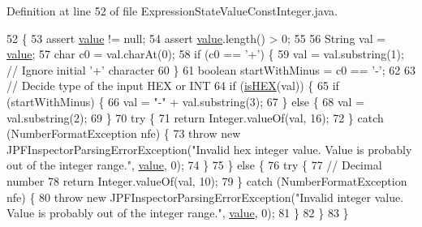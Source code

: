 Definition at line 52 of file Expression\+State\+Value\+Const\+Integer.\+java.


\begin{DoxyCode}
52                                                                                              \{
53     assert \hyperlink{classgov_1_1nasa_1_1jpf_1_1inspector_1_1server_1_1expression_1_1expressions_1_1_expression_state_value_const_integer_a17498ef8a0993ee14ae829c5aaf420b6}{value} != null;
54     assert \hyperlink{classgov_1_1nasa_1_1jpf_1_1inspector_1_1server_1_1expression_1_1expressions_1_1_expression_state_value_const_integer_a17498ef8a0993ee14ae829c5aaf420b6}{value}.length() > 0;
55 
56     String val = \hyperlink{classgov_1_1nasa_1_1jpf_1_1inspector_1_1server_1_1expression_1_1expressions_1_1_expression_state_value_const_integer_a17498ef8a0993ee14ae829c5aaf420b6}{value};
57     \textcolor{keywordtype}{char} c0 = val.charAt(0);
58     \textcolor{keywordflow}{if} (c0 == \textcolor{charliteral}{'+'}) \{
59       val = val.substring(1); \textcolor{comment}{// Ignore initial '+' character}
60     \}
61     \textcolor{keywordtype}{boolean} startWithMinus = c0 == \textcolor{charliteral}{'-'};
62 
63     \textcolor{comment}{// Decide type of the input HEX or INT}
64     \textcolor{keywordflow}{if} (\hyperlink{classgov_1_1nasa_1_1jpf_1_1inspector_1_1server_1_1expression_1_1expressions_1_1_expression_state_value_const_integer_aa6e13764893297b86baee31938f2066d}{isHEX}(val)) \{
65       \textcolor{keywordflow}{if} (startWithMinus) \{
66         val = \textcolor{stringliteral}{"-"} + val.substring(3);
67       \} \textcolor{keywordflow}{else} \{
68         val = val.substring(2);
69       \}
70       \textcolor{keywordflow}{try} \{
71         \textcolor{keywordflow}{return} Integer.valueOf(val, 16);
72       \} \textcolor{keywordflow}{catch} (NumberFormatException nfe) \{
73         \textcolor{keywordflow}{throw} \textcolor{keyword}{new} JPFInspectorParsingErrorException(\textcolor{stringliteral}{"Invalid hex integer value. Value is probably out of
       the integer range."}, \hyperlink{classgov_1_1nasa_1_1jpf_1_1inspector_1_1server_1_1expression_1_1expressions_1_1_expression_state_value_const_integer_a17498ef8a0993ee14ae829c5aaf420b6}{value}, 0);
74       \}
75     \} \textcolor{keywordflow}{else} \{
76       \textcolor{keywordflow}{try} \{
77         \textcolor{comment}{// Decimal number}
78         \textcolor{keywordflow}{return} Integer.valueOf(val, 10);
79       \} \textcolor{keywordflow}{catch} (NumberFormatException nfe) \{
80         \textcolor{keywordflow}{throw} \textcolor{keyword}{new} JPFInspectorParsingErrorException(\textcolor{stringliteral}{"Invalid integer value. Value is probably out of the
       integer range."}, \hyperlink{classgov_1_1nasa_1_1jpf_1_1inspector_1_1server_1_1expression_1_1expressions_1_1_expression_state_value_const_integer_a17498ef8a0993ee14ae829c5aaf420b6}{value}, 0);
81       \}
82     \}
83   \}
\end{DoxyCode}
